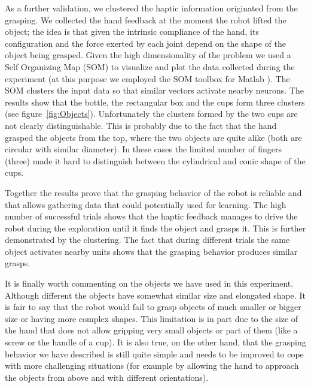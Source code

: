 As a further validation, we clustered the haptic information
originated from the grasping. We collected the hand feedback at
the moment the robot lifted the object; the idea is that given the
intrinsic compliance of the hand, its configuration and the force
exerted by each joint depend on the shape of the object being
grasped. Given the high dimensionality of the problem we used
a Self Organizing Map (SOM) to visualize and plot the data collected
during the experiment (at this purpose we employed the SOM toolbox for 
Matlab \cite{somToolbox}).
The SOM clusters the input data so that similar vectors activate 
nearby neurons.
The results show that the bottle, the rectangular box and the cups 
form three clusters (see figure~\ref{fig:Objects}). 
Unfortunately the clusters formed by the two cups are not clearly
distinguishable. This is probably due to the fact that the hand
grasped the objects from the top, where the two
objects are quite alike (both are circular with similar diameter).
In these cases the limited number of fingers (three) made it hard
to distinguish between the cylindrical and conic shape of the
cups. 

Together the results prove that the grasping behavior of the
robot is reliable and that allows gathering data that could 
potentially used for learning. The high number of successful trials shows that
the haptic feedback manages to drive the robot during the
exploration until it finds the object and grasps it. This is
further demonstrated by the clustering. The fact that during 
different trials the same object activates nearby units 
shows that the grasping behavior produces similar grasps.


It is finally worth commenting on the objects we have used in this experiment. 
Although different the objects
have somewhat similar size and elongated shape. It is fair to say that 
the robot would fail to grasp objects of much smaller or bigger 
size or having more complex shapes. This limitation is in part due to 
the size of the hand that does not allow gripping very 
small objects or part of them (like a screw or the handle of a cup). 
It is also true, on the other hand, that the grasping behavior we have
described is still quite simple and needs to be improved to cope with 
more challenging situations (for example by allowing the hand to approach
the objects from above and with different orientations).
%
